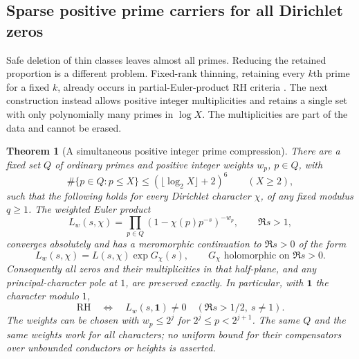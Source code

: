 \documentclass[11pt]{article}
\newtheorem{theorem}{Theorem}[section]
\theoremstyle{definition}
\begin{document}
\subsection{Sparse positive prime carriers for all Dirichlet zeros}
\label{sec:sparse-positive-prime-carriers}

Safe deletion of thin classes leaves almost all primes. Reducing
the retained proportion is a different problem. Fixed-rank
thinning, retaining every $k$th prime for a fixed $k$, already
occurs in partial-Euler-product RH criteria
\cite{JurzakPartialEuler}. The next construction instead
allows positive integer multiplicities and retains a single
set with only polynomially many primes in $\log X$.
The multiplicities are part of the data and cannot be erased.

\begin{theorem}[A simultaneous positive integer prime compression]
\label{thm:universal-prime-compression}
There are a fixed set $Q$ of ordinary primes and positive
integer weights $w_p$, $p\in Q$, with
\[
 \#\{p\in Q:p\le X\}
 \le(\lfloor\log_2X\rfloor+2)^6\qquad(X\ge2),
\]
such that the following holds for \emph{every} Dirichlet
character $\chi$, of any fixed modulus $q\ge1$.
The weighted Euler product
\[
 L_w(s,\chi)=\prod_{p\in Q}(1-\chi(p)p^{-s})^{-w_p},
 \qquad\Re s>1,
\]
converges absolutely and has a meromorphic continuation to
$\Re s>0$ of the form
\[
 L_w(s,\chi)=L(s,\chi)\exp G_\chi(s),
 \qquad G_\chi\text{ holomorphic on }\Re s>0.
\]
Consequently all zeros and their multiplicities in that
half-plane, and any principal-character pole at $1$, are
preserved exactly. In particular, with $\boldsymbol1$ the
character modulo $1$,
\[
 \mathrm{RH}\quad\Longleftrightarrow\quad
 L_w(s,\boldsymbol1)\ne0
 \quad(\Re s>1/2,\ s\ne1).
\]
The weights can be chosen with $w_p\le2^j$ for
$2^j\le p<2^{j+1}$. The same $Q$ and the same weights work
for all characters; no uniform bound for their compensators
over unbounded conductors or heights is asserted.
\end{theorem}
\end{document}
